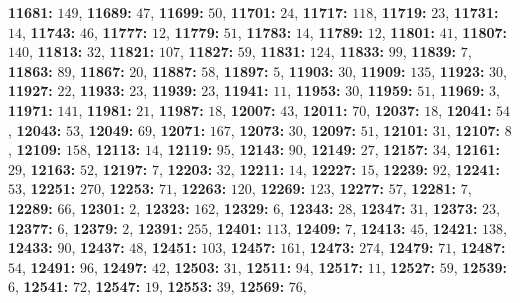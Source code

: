\textsf{\bfseries 11681:} $149$, \textsf{\bfseries 11689:} $47$, \textsf{\bfseries 11699:} $50$, \textsf{\bfseries 11701:} $24$, \textsf{\bfseries 11717:} $118$, \textsf{\bfseries 11719:} $23$, \textsf{\bfseries 11731:} $14$, \textsf{\bfseries 11743:} $46$, \textsf{\bfseries 11777:} $12$, \textsf{\bfseries 11779:} $51$, \textsf{\bfseries 11783:} $14$, \textsf{\bfseries 11789:} $12$, \textsf{\bfseries 11801:} $41$, \textsf{\bfseries 11807:} $140$, \textsf{\bfseries 11813:} $32$, \textsf{\bfseries 11821:} $107$, \textsf{\bfseries 11827:} $59$, \textsf{\bfseries 11831:} $124$, \textsf{\bfseries 11833:} $99$, \textsf{\bfseries 11839:} $7$, \textsf{\bfseries 11863:} $89$, \textsf{\bfseries 11867:} $20$, \textsf{\bfseries 11887:} $58$, \textsf{\bfseries 11897:} $5$, \textsf{\bfseries 11903:} $30$, \textsf{\bfseries 11909:} $135$, \textsf{\bfseries 11923:} $30$, \textsf{\bfseries 11927:} $22$, \textsf{\bfseries 11933:} $23$, \textsf{\bfseries 11939:} $23$, \textsf{\bfseries 11941:} $11$, \textsf{\bfseries 11953:} $30$, \textsf{\bfseries 11959:} $51$, \textsf{\bfseries 11969:} $3$, \textsf{\bfseries 11971:} $141$, \textsf{\bfseries 11981:} $21$, \textsf{\bfseries 11987:} $18$, \textsf{\bfseries 12007:} $43$, \textsf{\bfseries 12011:} $70$, \textsf{\bfseries 12037:} $18$, \textsf{\bfseries 12041:} $54$, \textsf{\bfseries 12043:} $53$, \textsf{\bfseries 12049:} $69$, \textsf{\bfseries 12071:} $167$, \textsf{\bfseries 12073:} $30$, \textsf{\bfseries 12097:} $51$, \textsf{\bfseries 12101:} $31$, \textsf{\bfseries 12107:} $8$, \textsf{\bfseries 12109:} $158$, \textsf{\bfseries 12113:} $14$, \textsf{\bfseries 12119:} $95$, \textsf{\bfseries 12143:} $90$, \textsf{\bfseries 12149:} $27$, \textsf{\bfseries 12157:} $34$, \textsf{\bfseries 12161:} $29$, \textsf{\bfseries 12163:} $52$, \textsf{\bfseries 12197:} $7$, \textsf{\bfseries 12203:} $32$, \textsf{\bfseries 12211:} $14$, \textsf{\bfseries 12227:} $15$, \textsf{\bfseries 12239:} $92$, \textsf{\bfseries 12241:} $53$, \textsf{\bfseries 12251:} $270$, \textsf{\bfseries 12253:} $71$, \textsf{\bfseries 12263:} $120$, \textsf{\bfseries 12269:} $123$, \textsf{\bfseries 12277:} $57$, \textsf{\bfseries 12281:} $7$, \textsf{\bfseries 12289:} $66$, \textsf{\bfseries 12301:} $2$, \textsf{\bfseries 12323:} $162$, \textsf{\bfseries 12329:} $6$, \textsf{\bfseries 12343:} $28$, \textsf{\bfseries 12347:} $31$, \textsf{\bfseries 12373:} $23$, \textsf{\bfseries 12377:} $6$, \textsf{\bfseries 12379:} $2$, \textsf{\bfseries 12391:} $255$, \textsf{\bfseries 12401:} $113$, \textsf{\bfseries 12409:} $7$, \textsf{\bfseries 12413:} $45$, \textsf{\bfseries 12421:} $138$, \textsf{\bfseries 12433:} $90$, \textsf{\bfseries 12437:} $48$, \textsf{\bfseries 12451:} $103$, \textsf{\bfseries 12457:} $161$, \textsf{\bfseries 12473:} $274$, \textsf{\bfseries 12479:} $71$, \textsf{\bfseries 12487:} $54$, \textsf{\bfseries 12491:} $96$, \textsf{\bfseries 12497:} $42$, \textsf{\bfseries 12503:} $31$, \textsf{\bfseries 12511:} $94$, \textsf{\bfseries 12517:} $11$, \textsf{\bfseries 12527:} $59$, \textsf{\bfseries 12539:} $6$, \textsf{\bfseries 12541:} $72$, \textsf{\bfseries 12547:} $19$, \textsf{\bfseries 12553:} $39$, \textsf{\bfseries 12569:} $76$, 
